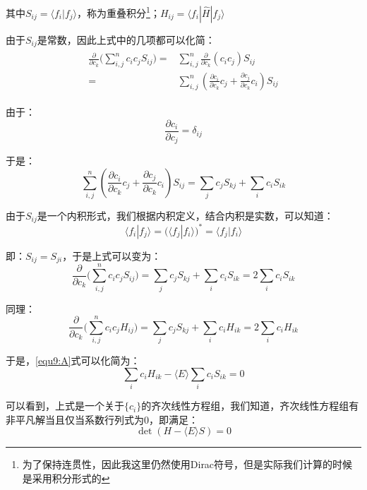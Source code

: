 其中$S_{ij}=\langle f_i|f_j\rangle$，称为重叠积分\footnote{为了保持连贯性，因此我这里仍然使用Dirac符号，但是实际我们计算的时候是采用积分形式的}；$H_{ij}=\langle f_i|\hat{H}|f_j\rangle$

由于$S_{ij}$是常数，因此上式中的几项都可以化简：
\begin{align}
    \begin{split}
        \frac{\partial}{\partial c_k}\Big(\sum_{i,j}^n c_ic_jS_{ij}\Big)=&\sum_{i,j}^n\frac{\partial}{\partial c_k}( c_ic_j)S_{ij}\\
        =&\sum_{i,j}^n(\frac{\partial c_i}{\partial c_k}c_j+\frac{\partial c_j}{\partial c_k}c_i)S_{ij}
    \end{split}
\end{align}

由于：
\begin{equation}
    \frac{\partial c_i}{\partial c_j}=\delta_{ij}
\end{equation}

于是：
\begin{equation}
    \sum_{i,j}^n(\frac{\partial c_i}{\partial c_k}c_j+\frac{\partial c_j}{\partial c_k}c_i)S_{ij}=\sum_j c_jS_{kj}+\sum_i c_i S_{ik}
\end{equation}

由于$S_{ij}$是一个内积形式，我们根据内积定义，结合内积是实数，可以知道：
\begin{equation}
    \langle f_i|f_j\rangle=(\langle f_j|f_i\rangle)^*=\langle f_j|f_i\rangle
\end{equation}

即：$S_{ij}=S_{ji}$，于是上式可以变为：
\begin{equation}
    \frac{\partial}{\partial c_k}\Big(\sum_{i,j}^n c_ic_jS_{ij}\Big)=\sum_j c_jS_{kj}+\sum_i c_i S_{ik}=2\sum_i c_i S_{ik}
\end{equation}

同理：
\begin{equation}
    \frac{\partial}{\partial c_k}\Big(\sum_{i,j}^n c_ic_jH_{ij}\Big)=\sum_j c_jS_{kj}+\sum_i c_i H_{ik}=2\sum_i c_i H_{ik}
\end{equation}

于是，\ref{equ9:A}式可以化简为：
\begin{equation}\label{equ9:B}
    \sum_i c_iH_{ik}-\langle E\rangle\sum_i c_iS_{ik}=0
\end{equation}

可以看到，上式是一个关于$\{c_i\}$的齐次线性方程组，我们知道，齐次线性方程组有非平凡解当且仅当系数行列式为0，即满足：
\begin{equation}
    \det(H-\langle E\rangle S)=0
\end{equation}


